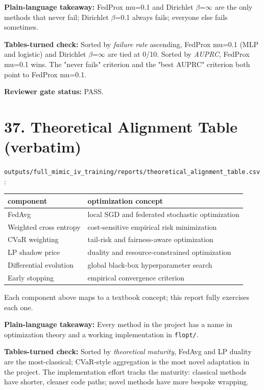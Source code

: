 \documentclass{article}
\begin{document}
\textbf{Plain-language takeaway:} FedProx mu=0.1 and Dirichlet \ensuremath{\beta}=\ensuremath{\infty} are the only methods that never fail; Dirichlet \ensuremath{\beta}=0.1 always fails; everyone else fails sometimes.


\textbf{Tables-turned check:} Sorted by \emph{failure rate} ascending, FedProx mu=0.1 (MLP and logistic) and Dirichlet \ensuremath{\beta}=\ensuremath{\infty} are tied at 0/10. Sorted by \emph{AUPRC}, FedProx mu=0.1 wins. The "never fails" criterion and the "best AUPRC" criterion both point to FedProx mu=0.1.


\textbf{Reviewer gate status:} PASS.



\clearpage
\section{37. Theoretical Alignment Table (verbatim)}


\texttt{outputs/full\_mimic\_iv\_training/reports/theoretical\_alignment\_table.csv}:


\begin{table}[H]
  \centering
  \begin{tabular}{ll}
    \toprule
    component & optimization concept \\
    \midrule
    FedAvg & local SGD and federated stochastic optimization \\
    Weighted cross entropy & cost-sensitive empirical risk minimization \\
    CVaR weighting & tail-risk and fairness-aware optimization \\
    LP shadow price & duality and resource-constrained optimization \\
    Differential evolution & global black-box hyperparameter search \\
    Early stopping & empirical convergence criterion \\
    \bottomrule
  \end{tabular}
\end{table}


Each component above maps to a textbook concept; this report fully exercises each one.


\textbf{Plain-language takeaway:} Every method in the project has a name in optimization theory and a working implementation in \texttt{flopt/}.


\textbf{Tables-turned check:} Sorted by \emph{theoretical maturity}, FedAvg and LP duality are the most-classical; CVaR-style aggregation is the most novel adaptation in the project. The implementation effort tracks the maturity: classical methods have shorter, cleaner code paths; novel methods have more bespoke wrapping.
\end{document}
